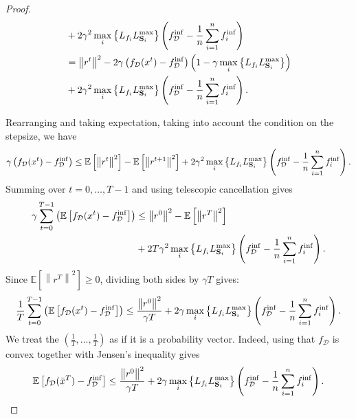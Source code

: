 \documentclass{article}
\newcommand{\bb}{\mathbb}
\newcommand{\norm}[1]{\left\| #1 \right\|}
\newcommand{\Exp}[1]{{\bb E}\left[#1\right]}
\theoremstyle{plain}
\newcommand{\tf}{f_{\mathcal{D}}}
\newcommand{\mS}{{\bf S}}
\theoremstyle{plain}
\theoremstyle{definition}
\theoremstyle{remark}
\begin{document}
\begin{proof}
\begin{equation*}
\begin{split}
			& + 2\gamma^2\max_i\left\lbrace L_{f_i}L_{\mS_i}^{\max} \right\rbrace \left(\tf^{\inf} - \frac{1}{n}\sum_{i=1}^{n}f_i^{\inf}\right)\\
			& = \left\|r^{t}\right\|^2 - 2\gamma\left( \tf(x^t) - \tf^{\inf}\right)\left(1 - \gamma\max_i\left\lbrace L_{f_i}L_{\mS_i}^{\max} \right\rbrace\right)\\
			& + 2\gamma^2\max_i\left\lbrace L_{f_i}L_{\mS_i}^{\max} \right\rbrace \left(\tf^{\inf} - \frac{1}{n}\sum_{i=1}^{n}f_i^{\inf}\right).\\
		\end{split}
	\end{equation*}

	Rearranging and taking expectation, taking into account the condition on the stepsize, we have
	\begin{equation*}
		\begin{split}
			\gamma\left( \tf(x^t) - \tf^{\inf}\right) &\leq \Exp{\norm{r^t}^2} - \Exp{\norm{r^{t+1}}^2} + 2\gamma^2\max_i\left\lbrace L_{f_i}L_{\mS_i}^{\max} \right\rbrace\left(\tf^{\inf} - \frac{1}{n}\sum_{i=1}^{n}f_i^{\inf}\right).\\
		\end{split}
	\end{equation*}
	Summing over $t = 0,\ldots, T-1$ and using telescopic cancellation gives
	\begin{equation*}
		\begin{split}
			\gamma\sum_{t=0}^{T-1}\left(\Exp{\tf(x^t) - \tf^{\inf}}\right) &\leq \norm{r^0}^2 - \Exp{\norm{r^{T}}^2}\\ & + 2T\gamma^2\max_i\left\lbrace L_{f_i}L_{\mS_i}^{\max} \right\rbrace\left(\tf^{\inf} - \frac{1}{n}\sum_{i=1}^{n}f_i^{\inf}\right).\\
		\end{split}
	\end{equation*}
	Since $\Exp{\norm{r^{T}}^2} \geq 0$, dividing both sides by $\gamma T$ gives:
	\begin{equation*}
		\begin{split}
			\frac{1}{T}\sum_{t=0}^{T-1}\left(\Exp{\tf(x^t) - \tf^{\inf}}\right) &\leq \frac{\norm{r^0}^2}{\gamma T} + 2\gamma\max_i\left\lbrace L_{f_i}L_{\mS_i}^{\max} \right\rbrace\left(\tf^{\inf} - \frac{1}{n}\sum_{i=1}^{n}f_i^{\inf}\right).\\
		\end{split}
	\end{equation*}
	We treat the $\left(\frac{1}{T},\ldots,\frac{1}{T}\right)$ as if it is a probability vector.
	Indeed, using that $\tf$ is convex together with Jensen's inequality gives
	\begin{equation*}
		\begin{split}
			\Exp{\tf(\bar{x}^T) - \tf^{\inf}}&\leq \frac{\norm{r^0}^2}{\gamma T} + 2\gamma\max_i\left\lbrace L_{f_i}L_{\mS_i}^{\max} \right\rbrace\left(\tf^{\inf} - \frac{1}{n}\sum_{i=1}^{n}f_i^{\inf}\right).\\
		\end{split}
	\end{equation*}
\end{proof}
\end{document}
